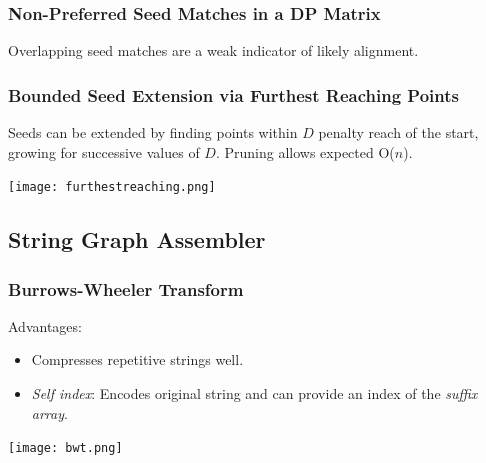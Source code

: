 \documentclass{beamer}
\begin{document}
\begin{frame}
\frametitle{Non-Preferred Seed Matches in a DP Matrix}
Overlapping seed matches are a weak indicator of likely alignment.  


% 
\end{frame}




\begin{frame}
\frametitle{Bounded Seed Extension via Furthest Reaching Points}
Seeds can be extended by finding points within $D$ penalty reach of the start, growing for successive values of $D$.  Pruning allows expected O($n$).

\texttt{[image: furthestreaching.png]}

\end{frame}




\subsection{String Graph Assembler}
\begin{frame}
\frametitle{Burrows-Wheeler Transform}
Advantages:
\begin{itemize}
  \item Compresses repetitive strings well.
  \item \emph{Self index}: Encodes original string and can provide an index of the \emph{suffix array}.
\end{itemize}
\texttt{[image: bwt.png]}

% 
\end{frame}
\end{document}
